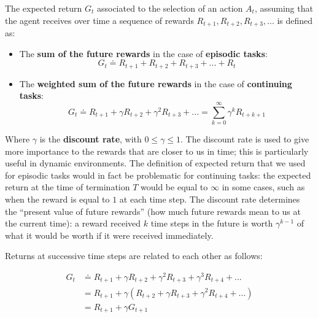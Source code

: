 The expected return $G_t$ associated to the selection of an action $A_t$, assuming that the agent receives over time a sequence of rewards $R_{t+1}, R_{t+2}, R_{t+3}, ...$ is defined as:

\begin{itemize}
    \item The \textbf{sum of the future rewards} in the case of \textbf{episodic tasks}:
    \begin{equation}
        G_t \doteq R_{t+1} + R_{t+2} + R_{t+3} + ... + R_t
        \label{eq:ch2-expectedreturn-episodic}
    \end{equation}
    \item The \textbf{weighted sum of the future rewards} in the case of \textbf{continuing tasks}:
    \begin{equation}
        G_t \doteq R_{t+1} + \gamma R_{t+2} + \gamma^2 R_{t+3} + ... = \sum_{k=0}^{\infty} \gamma^k R_{t+k+1}
        \label{eq:ch2-expectedreturn-continuous}
    \end{equation}
\end{itemize}

Where $\gamma$ is the \textbf{discount rate}, with $0 \le \gamma \le 1$. The discount rate is used to give more importance to the rewards that are closer to us in time; this is particularly useful in dynamic environments. The definition of expected return that we used for episodic tasks would in fact be problematic for continuing tasks: the expected return at the time of termination $T$ would be equal to $\infty$ in some cases, such as when the reward is equal to $1$ at each time step. The discount rate determines the ``present value of future rewards'' (how much future rewards mean to us at the current time): a reward received $k$ time steps in the future is worth $\gamma^{k-1}$ of what it would be worth if it were received immediately.

Returns at successive time steps are related to each other as follows:

\begin{equation*}
    \begin{split}
        G_t & \doteq R_{t+1} + \gamma R_{t+2} + \gamma^2 R_{t+3} + \gamma^3 R_{t+4} + ... \\
        & = R_{t+1} + \gamma \left( R_{t+2} + \gamma R_{t+3} + \gamma^2 R_{t+4} + ... \right) \\
        & = R_{t+1} + \gamma G_{t+1} \\
    \end{split}
\end{equation*}

